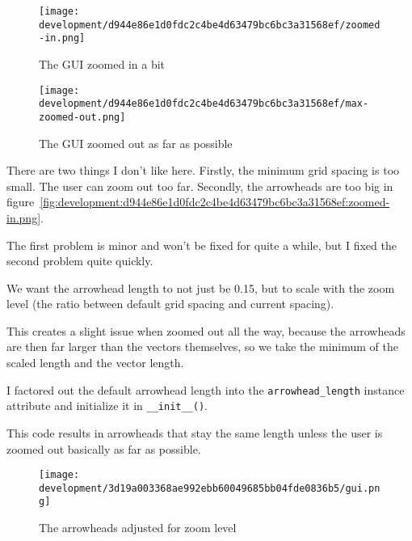\documentclass[../development.tex]{subfiles}
\begin{document}
\begin{figure}[H]
	\hspace{0.005\linewidth}
	\centering
	\begin{minipage}{0.48\linewidth}
		\centering
		\texttt{[image: development/d944e86e1d0fdc2c4be4d63479bc6bc3a31568ef/zoomed-in.png]}
		\caption{The GUI zoomed in a bit}
		\label{fig:development:d944e86e1d0fdc2c4be4d63479bc6bc3a31568ef:zoomed-in.png}
	\end{minipage}\hspace{0.015\linewidth}
	\begin{minipage}{0.48\linewidth}
		\centering
		\texttt{[image: development/d944e86e1d0fdc2c4be4d63479bc6bc3a31568ef/max-zoomed-out.png]}
		\caption{The GUI zoomed out as far as possible}
		\label{fig:development:d944e86e1d0fdc2c4be4d63479bc6bc3a31568ef:max-zoomed-out.png}
	\end{minipage}
	\hspace{0.005\linewidth}
	\vspace{-1em}
\end{figure}

There are two things I don't like here. Firstly, the minimum grid spacing is too small. The user can zoom out too far. Secondly, the arrowheads are too big in figure~\ref{fig:development:d944e86e1d0fdc2c4be4d63479bc6bc3a31568ef:zoomed-in.png}.

The first problem is minor and won't be fixed for quite a while, but I fixed the second problem quite quickly.

We want the arrowhead length to not just be 0.15, but to scale with the zoom level (the ratio between default grid spacing and current spacing).

This creates a slight issue when zoomed out all the way, because the arrowheads are then far larger than the vectors themselves, so we take the minimum of the scaled length and the vector length.

I factored out the default arrowhead length into the \texttt{arrowhead\_length} instance attribute and initialize it in \texttt{\_\_init\_\_()}.


This code results in arrowheads that stay the same length unless the user is zoomed out basically as far as possible.

\begin{figure}[H]
	\centering
	\texttt{[image: development/3d19a003368ae992ebb60049685bb04fde0836b5/gui.png]}
	\caption{The arrowheads adjusted for zoom level}
	\label{fig:development:3d19a003368ae992ebb60049685bb04fde0836b5:gui.png}
\end{figure}
\end{document}
